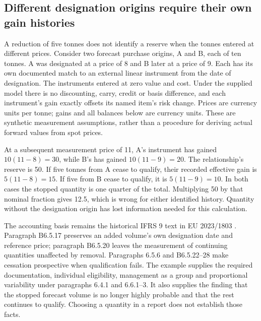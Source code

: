 \subsection{Different designation origins require their own gain histories}
\label{sec:origin-matched-cessation}

A reduction of five tonnes does not identify a reserve when the tonnes entered
at different prices. Consider two forecast purchase origins, A and B, each of
ten tonnes. A was designated at a price of 8 and B later at a price of 9.
Each has its own documented match to an external linear instrument from the
date of designation. The instruments entered at zero value and cost. Under
the supplied model there is no discounting, carry, credit or basis difference,
and each instrument's gain exactly offsets its named item's risk change.
Prices are currency units per tonne; gains and all balances below are currency
units. These are synthetic measurement assumptions, rather than a procedure
for deriving actual forward values from spot prices.

At a subsequent measurement price of 11, A's instrument has gained
\(10(11-8)=30\), while B's has gained \(10(11-9)=20\).
The relationship's reserve is 50. If five tonnes from A cease to qualify, their
recorded effective gain is \(5(11-8)=15\). If five from B cease to qualify,
it is \(5(11-9)=10\). In both cases the stopped quantity is one quarter of
the total. Multiplying 50 by that nominal fraction gives 12.5, which is wrong
for either identified history. Quantity without the designation origin has
lost information needed for this calculation.

The accounting basis remains the historical IFRS 9 text in EU 2023/1803
\citep{eu20231803}. Paragraph B6.5.17 preserves an added volume's own
designation date and reference price; paragraph B6.5.20 leaves the measurement
of continuing quantities unaffected by removal. Paragraphs 6.5.6 and
B6.5.22--28 make cessation prospective when qualification fails.
The example supplies the required documentation, individual eligibility,
management as a group and proportional variability under paragraphs 6.4.1
and 6.6.1--3. It also supplies the finding that the stopped forecast volume
is no longer highly probable and that the rest continues to qualify.
Choosing a quantity in a report does not establish those facts.

